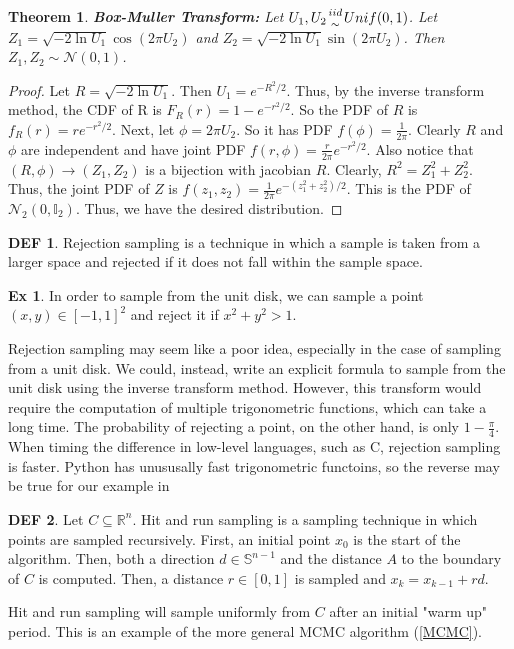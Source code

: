 \documentclass{article}
\newtheorem{theorem}{Theorem}
\theoremstyle{definition}\newtheorem{definition}{DEF}
\theoremstyle{definition}\newtheorem{example}{Ex}
\theoremstyle{lemma}\newtheorem{lemma}{Lemma}
\theoremstyle{corrolary}\newtheorem{corrolary}{Cor}
\begin{document}
\begin{theorem}
\textbf{Box-Muller Transform:}
Let $U_1, U_2 {iid \atop \sim} Unif(0,1)$.
Let $Z_1 = \sqrt{-2\ln U_1}\cos (2\pi U_2)$ and $Z_2 = \sqrt{-2\ln U_1} \sin(2\pi U_2)$.
Then $Z_1, Z_2 \sim \mathcal{N}(0,1)$.
\end{theorem}
\begin{proof}
Let $R=\sqrt{-2\ln U_1}$.
Then $U_1 = e^{-R^2/2}$.
Thus, by the inverse transform method, the CDF of R is $F_R(r)=1-e^{-r^2/2}$.
So the PDF of $R$ is $f_R(r)=re^{-r^2/2}$.
Next, let $\phi = 2\pi U_2$.
So it has PDF $f(\phi)=\frac{1}{2\pi}$.
Clearly $R$ and $\phi$ are independent and have joint PDF $f(r,\phi)=\frac{r}{2\pi}e^{-r^2/2}$.
Also notice that $(R, \phi) \rightarrow (Z_1, Z_2)$ is a bijection with jacobian $R$.
Clearly, $R^2 = Z_1^2 + Z_2^2$.
Thus, the joint PDF of $Z$ is $f(z_1, z_2)=\frac{1}{2\pi} e^{-(z_1^2 + z_2^2)/2}$.
This is the PDF of $\mathcal{N}_2(0, \mathbb{I}_2)$.
Thus, we have the desired distribution.
\end{proof}

\begin{definition}
Rejection sampling is a technique in which a sample is taken from a larger space and rejected if it does not fall within the sample space.
\end{definition}

\begin{example}\label{circle_rejection_sampling}
In order to sample from the unit disk, we can sample a point $(x,y)\in [-1,1]^2$ and reject it if $x^2 + y^2 > 1$.\\
\end{example}

Rejection sampling may seem like a poor idea, especially in the case of sampling from a unit disk.
We could, instead, write an explicit formula to sample from the unit disk using the inverse transform method.
However, this transform would require the computation of multiple trigonometric functions, which can take a long time.
The probability of rejecting a point, on the other hand, is only $1-\frac{\pi}{4}$.
When timing the difference in low-level languages, such as C, rejection sampling is faster.
Python has unususally fast trigonometric functoins, so the reverse may be true for our example in 

\begin{definition}
Let $C\subseteq \mathbb{R}^n$.
Hit and run sampling is a sampling technique in which points are sampled recursively.
First, an initial point $x_0$ is the start of the algorithm.
Then, both a direction $d\in \mathbb{S}^{n-1}$ and the distance $A$ to the boundary of $C$ is computed.
Then, a distance $r\in [0,1]$ is sampled and $x_k=x_{k-1}+rd$.
\end{definition}

Hit and run sampling will sample uniformly from $C$ after an initial "warm up" period.
This is an example of the more general MCMC algorithm (\ref{MCMC}).
\end{document}

